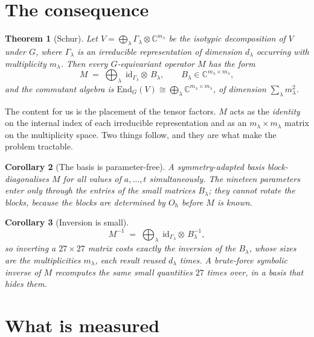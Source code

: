 \documentclass[11pt]{article}
\newtheorem{theorem}{Theorem}
\newtheorem{corollary}[theorem]{Corollary}
\begin{document}
\section{The consequence}

\begin{theorem}[Schur]
Let $V=\bigoplus_\lambda \Gamma_\lambda\otimes\mathbb{C}^{m_\lambda}$ be the
isotypic decomposition of $V$ under $G$, where $\Gamma_\lambda$ is an irreducible
representation of dimension $d_\lambda$ occurring with multiplicity $m_\lambda$.
Then every $G$-equivariant operator $M$ has the form
\[
  M \;=\; \bigoplus_\lambda \; \mathrm{id}_{\Gamma_\lambda} \otimes\, B_\lambda ,
  \qquad B_\lambda \in \mathbb{C}^{m_\lambda\times m_\lambda},
\]
and the commutant algebra is $\mathrm{End}_G(V)\cong\bigoplus_\lambda
\mathbb{C}^{m_\lambda\times m_\lambda}$, of dimension $\sum_\lambda m_\lambda^2$.
\end{theorem}

The content for us is the placement of the tensor factors. $M$ acts as the
\emph{identity} on the internal index of each irreducible representation and as
an $m_\lambda\times m_\lambda$ matrix on the multiplicity space. Two things
follow, and they are what make the problem tractable.

\begin{corollary}[The basis is parameter-free]
A symmetry-adapted basis block-diagonalises $M$ for \emph{all} values of
$a,\dots,t$ simultaneously. The nineteen parameters enter only through the
entries of the small matrices $B_\lambda$; they cannot rotate the blocks,
because the blocks are determined by $O_h$ before $M$ is known.
\end{corollary}

\begin{corollary}[Inversion is small]
\[
  M^{-1} \;=\; \bigoplus_\lambda \;\mathrm{id}_{\Gamma_\lambda}\otimes\, B_\lambda^{-1},
\]
so inverting a $27\times27$ matrix costs exactly the inversion of the
$B_\lambda$, whose sizes are the \emph{multiplicities} $m_\lambda$, each result
reused $d_\lambda$ times. A brute-force symbolic inverse of $M$ recomputes the
same small quantities $27$ times over, in a basis that hides them.
\end{corollary}

\section{What is measured}
\end{document}
